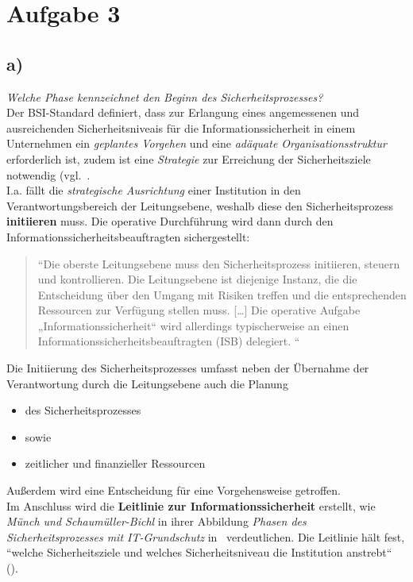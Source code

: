 \chapter{Aufgabe 3}

\section{a)}

\textit{Welche Phase kennzeichnet den Beginn des Sicherheitsprozesses?}\\

\noindent
Der BSI-Standard definiert, dass zur Erlangung eines angemessenen und ausreichenden Sicherheitsniveais für die Informationssicherheit in einem Unternehmen ein \textit{geplantes Vorgehen} und eine \textit{adäquate Organisationsstruktur} erforderlich ist, zudem ist eine \textit{Strategie} zur Erreichung der Sicherheitsziele notwendig (vgl.~\cite[20]{BSI200-2}.\\

\noindent
I.a. fällt die \textit{strategische Ausrichtung} einer Institution in den Verantwortungsbereich der Leitungsebene, weshalb diese den Sicherheitsprozess \textbf{initiieren} muss.
Die operative Durchführung wird dann durch den Informationssicherheitsbeauftragten sichergestellt:

\blockquote[{\cite[20]{BSI200-2}}]{
    ``Die oberste Leitungsebene muss den Sicherheitsprozess initiieren, steuern und kontrollieren. Die Leitungsebene ist diejenige Instanz, die die Entscheidung über den Umgang mit Risiken treffen und die
    entsprechenden Ressourcen zur Verfügung stellen muss.
    [\ldots]
    Die operative Aufgabe „Informationssicherheit“ wird allerdings typischerweise an
    einen Informationssicherheitsbeauftragten (ISB) delegiert.
    ``
}

\noindent
Die Initiierung des Sicherheitsprozesses umfasst neben der Übernahme der Verantwortung durch die Leitungsebene auch die Planung
\begin{itemize}
    \itemsep0.5em
    \item des Sicherheitsprozesses
    \item[] sowie
    \item zeitlicher und finanzieller Ressourcen
\end{itemize}

\noindent
Außerdem wird eine  Entscheidung für eine Vorgehensweise getroffen.\\

\noindent
Im Anschluss wird die \textbf{Leitlinie zur Informationssicherheit} erstellt, wie \textit{Münch und Schaumüller-Bichl} in ihrer Abbildung \textit{Phasen des Sicherheitsprozesses mit IT-Grundschutz} in~\cite[\textbf{Abb. 3.2}, 32]{ITS2} verdeutlichen.
Die Leitlinie hält fest, ``welche Sicherheitsziele und welches Sicherheitsniveau die Institution anstrebt`` (\cite[32]{ITS2}).


